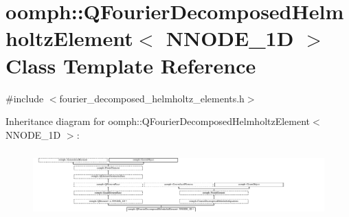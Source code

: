 \hypertarget{classoomph_1_1QFourierDecomposedHelmholtzElement}{}\section{oomph\+:\+:Q\+Fourier\+Decomposed\+Helmholtz\+Element$<$ N\+N\+O\+D\+E\+\_\+1D $>$ Class Template Reference}
\label{classoomph_1_1QFourierDecomposedHelmholtzElement}


{\ttfamily \#include $<$fourier\+\_\+decomposed\+\_\+helmholtz\+\_\+elements.\+h$>$}

Inheritance diagram for oomph\+:\+:Q\+Fourier\+Decomposed\+Helmholtz\+Element$<$ N\+N\+O\+D\+E\+\_\+1D $>$\+:\begin{figure}[H]
\begin{center}
\leavevmode
\includegraphics[height=2.592593cm]{classoomph_1_1QFourierDecomposedHelmholtzElement}
\end{center}
\end{figure}
